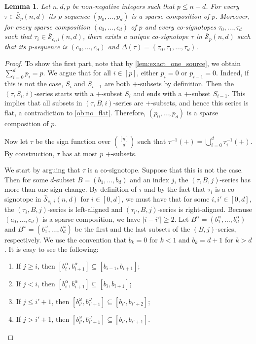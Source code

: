 \documentclass[a4paper,11pt]{amsart}
\newtheorem{lemma}[theorem]{Lemma}
\newcommand{\binnd}{\binom{[n]}{d}}
\newcommand{\calS}{\mathcal{S}}
\begin{document}
\begin{lemma}
\label{lem:decomp_reverse}
	Let $n,d,p$ be non-negative integers such that $p \leq n-d$.
    For every $\tau \in \bar{\calS}_{p}(n,d)$ its p-sequence $(p_0, \dots, p_d)$ is a sparse composition of $p$.
    Moreover, for every sparse composition $(c_0, \dots, c_d)$ of $p$ and every co-signotopes $\tau_0, 
	\dots, \tau_d$ such that $\tau_i \in \bar{\calS}_{c_i,i}(n,d)$, there exists a unique co-signotope $\tau$ in $\bar{\calS}_{p}(n,d)$ such that its p-sequence is $(c_0, \dots, c_d)$ and $\Delta(\tau) = (\tau_0,\tau_1,\dots,\tau_d)$.
\end{lemma}
\begin{proof}	
    To show the first part, note that by \cref{lem:exact_one_source}, we obtain $\sum^d_{i=0} p_i = p$.
	We argue that for all $i \in [p]$, either $p_i =0$ or $p_{i-1}=0$.
	Indeed, if this is not the case, 
    $S_i$ and $S_{i-1}$ are both $+$-subsets by definition. 
    Then the $(\tau,S_i,i)$-series starts with a $+$-subset $S_i$ and ends with a $+$-subset $S_{i-1}$.
	This implies that all subsets in $(\tau,B,i)$-series are $+$-subsets, and hence this series is flat, a contradiction to \cref{ob:no_flat}.
	Therefore, $(p_0, \dots, p_d)$ is a sparse composition of $p$.

	Now let $\tau$ be the sign function over $\binnd$ such that $\tau^{-1}(+) = \bigcup^d_{i=0} \tau_i^{-1}(+)$.
    By construction, $\tau$ has at most $p$ $+$-subsets.


	We start by arguing that $\tau$ is a co-signotope.
	Suppose that this is not the case.
	Then for some $d$-subset $B = (b_1, \dots, b_d)$ and an index $j$, the $(\tau,B,j)$-series has more than one sign change.
	By definition of $\tau$ and by the fact that $\tau_i$ is a co-signotope in $\bar{\calS}_{c_i,i}(n,d)$ for $i \in [0,d]$, we must have that for some $i, i' \in [0,d]$, the $(\tau_i,B,j)$-series is left-aligned and $(\tau_{i'},B,j)$-series is right-aligned.
	Because $(c_0, \dots, c_d)$ is a sparse composition, we have $|i-i'| \geq 2$.
	Let $B^{\alpha} = (b^{\alpha}_1, \dots, b^{\alpha}_d)$ and $B^{\omega} = (b^{\omega}_1, \dots, b^{\omega}_d)$ be the first and the last subsets of the $(B,j)$-series, respectively.
	We use the convention that $b_k = 0$ for $k < 1$ and $b_k = d+1$ for $k > d$.
	It is easy to see the following: 
    \begin{enumerate}[label=(\alph*)]
        \item If $j \geq i$, then $[b^{\alpha}_i, b^{\alpha}_{i+1}] \subseteq [b_{i-1},b_{i+1}]$;
        \item If $j < i$, then $[b^{\alpha}_i, b^{\alpha}_{i+1}] \subseteq [b_{i},b_{i+1}]$;
        \item If $j \leq i'+1$, then $[b^{\omega}_{i'}, b^{\omega}_{i'+1}] \subseteq [b_{i'},b_{i'+2}]$;
        \item If $j > i'+1$, then $[b^{\omega}_{i'}, b^{\omega}_{i'+1}] \subseteq [b_{i'},b_{i'+1}]$.
    \end{enumerate}


\end{proof}
\end{document}
